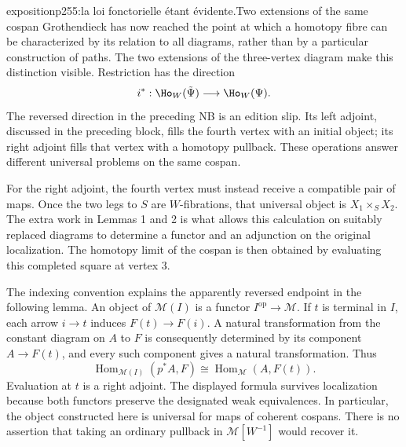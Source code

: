 \begin{dcomment}{exposition}{p255:la loi fonctorielle étant évidente.}{Two extensions of the same cospan}
Grothendieck has now reached the point at which a homotopy fibre can be characterized by its relation to all diagrams, rather than by a particular construction of paths. The two extensions of the three-vertex diagram make this distinction visible. Restriction has the direction
\[
 i^*: \Ho_W(\tilde\Psi)\longrightarrow\Ho_W(\Psi).
\]
The reversed direction in the preceding NB is an edition slip. Its left adjoint, discussed in the preceding block, fills the fourth vertex with an initial object; its right adjoint fills that vertex with a homotopy pullback. These operations answer different universal problems on the same cospan.

For the right adjoint, the fourth vertex must instead receive a compatible pair of maps. Once the two legs to $S$ are $W$-fibrations, that universal object is $X_1\times_S X_2$. The extra work in Lemmas 1 and 2 is what allows this calculation on suitably replaced diagrams to determine a functor and an adjunction on the original localization. The homotopy limit of the cospan is then obtained by evaluating this completed square at vertex 3.

The indexing convention explains the apparently reversed endpoint in the following lemma. An object of $\mathcal M(I)$ is a functor $I^{\mathrm{op}}\to\mathcal M$. If $t$ is terminal in $I$, each arrow $i\to t$ induces $F(t)\to F(i)$. A natural transformation from the constant diagram on $A$ to $F$ is consequently determined by its component $A\to F(t)$, and every such component gives a natural transformation. Thus
\[
 \operatorname{Hom}_{\mathcal M(I)}(p^*A,F)
 \cong \operatorname{Hom}_{\mathcal M}(A,F(t)).
\]
Evaluation at $t$ is a right adjoint. The displayed formula survives localization because both functors preserve the designated weak equivalences. In particular, the object constructed here is universal for maps of coherent cospans. There is no assertion that taking an ordinary pullback in $\mathcal M[W^{-1}]$ would recover it.
\end{dcomment}


